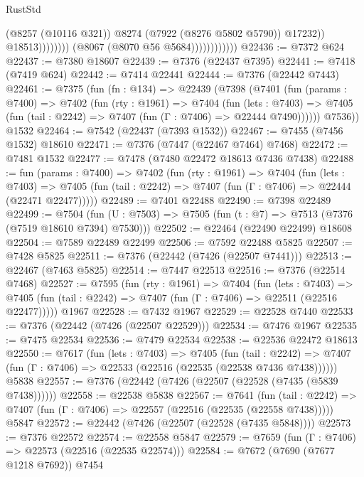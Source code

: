 \begin{lexlean}{RustStd}
\begin{coremodule}
                                            (@8257 (@10116 @321))
                                            @8274
                                            (@7922 (@8276 @5802 @5790))
                                            @17232))
                                        @18513))))))))
                        (@8067 (@8070 @56 @5684))))))))))))
@22436 := @7372 @624
@22437 := @7380 @18607
@22439 := @7376 (@22437 @7395)
@22441 := @7418 (@7419 @624)
@22442 := @7414 @22441
@22444 := @7376 (@22442 @7443)
@22461 := @7375
    (fun (fn : @134) =>
    @22439
      (@7398
        (@7401
          (fun (params : @7400) =>
          @7402
            (fun (rty : @1961) =>
            @7404
              (fun (lets : @7403) =>
              @7405 (fun (tail : @2242) => @7407 (fun (Γ : @7406) => @22444 @7490))))))
        @7536))
    @1532
@22464 := @7542 (@22437 (@7393 @1532))
@22467 := @7455 (@7456 @1532) @18610
@22471 := @7376 (@7447 (@22467 @7464) @7468)
@22472 := @7481 @1532
@22477 := @7478 (@7480 @22472 @18613 @7436 @7438)
@22488 := fun (params : @7400) =>
  @7402
    (fun (rty : @1961) =>
    @7404
      (fun (lets : @7403) =>
      @7405 (fun (tail : @2242) => @7407 (fun (Γ : @7406) => @22444 (@22471 @22477)))))
@22489 := @7401 @22488
@22490 := @7398 @22489
@22499 := @7504
    (fun (U : @7503) => @7505 (fun (t : @7) => @7513 (@7376 (@7519 @18610 @7394) @7530)))
@22502 := @22464 (@22490 @22499) @18608
@22504 := @7589 @22489 @22499
@22506 := @7592 @22488 @5825
@22507 := @7428 @5825
@22511 := @7376 (@22442 (@7426 (@22507 @7441)))
@22513 := @22467 (@7463 @5825)
@22514 := @7447 @22513
@22516 := @7376 (@22514 @7468)
@22527 := @7595
    (fun (rty : @1961) =>
    @7404
      (fun (lets : @7403) =>
      @7405 (fun (tail : @2242) => @7407 (fun (Γ : @7406) => @22511 (@22516 @22477)))))
    @1967
@22528 := @7432 @1967
@22529 := @22528 @7440
@22533 := @7376 (@22442 (@7426 (@22507 @22529)))
@22534 := @7476 @1967
@22535 := @7475 @22534
@22536 := @7479 @22534
@22538 := @22536 @22472 @18613
@22550 := @7617
    (fun (lets : @7403) =>
    @7405
      (fun (tail : @2242) =>
      @7407 (fun (Γ : @7406) => @22533 (@22516 (@22535 (@22538 @7436 @7438))))))
    @5838
@22557 := @7376 (@22442 (@7426 (@22507 (@22528 (@7435 (@5839 @7438))))))
@22558 := @22538 @5838
@22567 := @7641
    (fun (tail : @2242) => @7407 (fun (Γ : @7406) => @22557 (@22516 (@22535 (@22558 @7438)))))
    @5847
@22572 := @22442 (@7426 (@22507 (@22528 (@7435 @5848))))
@22573 := @7376 @22572
@22574 := @22558 @5847
@22579 := @7659 (fun (Γ : @7406) => @22573 (@22516 (@22535 @22574)))
@22584 := @7672 (@7690 (@7677 @1218 @7692)) @7454

\end{coremodule}
\end{lexlean}
